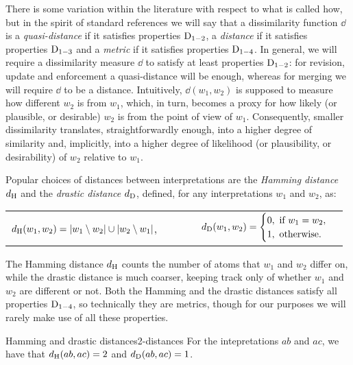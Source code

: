 There is some variation within the literature with respect to what is called how,
but in the spirit of standard references \cite{DezaD16}
we will say that a dissimilarity function $\dd$
is a \emph{quasi-distance} if it satisfies properties $\mathrm{D}_{1-2}$,
a \emph{distance} if it satisfies properties $\mathrm{D}_{1-3}$
and a \emph{metric} if it satisfies properties $\mathrm{D}_{1-4}$.
In general, we will require a dissimilarity measure $\dd$ to satisfy at least properties $\mathrm{D}_{1-2}$:
for revision, update and enforcement a quasi-distance will be enough,
whereas for merging we will require $\dd$ to be a distance.
Intuitively, $\dd(w_1,w_2)$ is supposed to measure how different $w_2$ is from $w_1$,
which, in turn, becomes a proxy for how likely (or plausible, or desirable) 
$w_2$ is from the point of view of $w_1$.
Consequently, smaller dissimilarity translates, straightforwardly enough, into a higher degree of similarity
and, implicitly, into a higher degree of likelihood (or plausibility, or desirability)
of $w_2$ relative to $w_1$.

Popular choices of distances between interpretations are the \emph{Hamming distance $d_{\operatorname{H}}$}
and the \emph{drastic distance $d_{\operatorname{D}}$}, defined, for any interpretations $w_1$ and $w_2$, as:
\begin{center}
	\begin{tabular}{cc}
		$d_{\operatorname{H}}(w_1,w_2)=|w_1\setminus w_2|\cup|w_2\setminus w_1|$,~~~~~~ &
		$
		d_{\operatorname{D}}(w_1,w_2)=
		\begin{cases}
			0,~\text{if}~w_1=w_2,\\
			1,~\text{otherwise}.
		\end{cases}
		$
	\end{tabular}
\end{center}
The Hamming distance $d_{\operatorname{H}}$ counts the number of atoms that $w_1$ and $w_2$ differ on,
while the drastic distance is much coarser, keeping track only of whether $w_1$ and $w_2$ are different or not.
Both the Hamming and the drastic distances satisfy all properties $\mathrm{D}_{1-4}$, so technically they are metrics,
though for our purposes we will rarely make use of all these properties.

\begin{xmpl}{Hamming and drastic distances}{2-distances}
	For the intepretations $ab$ and $ac$, we have that $d_{{\operatorname{H}}}(ab,ac)=2$ and $d_{{\operatorname{D}}}(ab,ac)=1$.
\end{xmpl}

